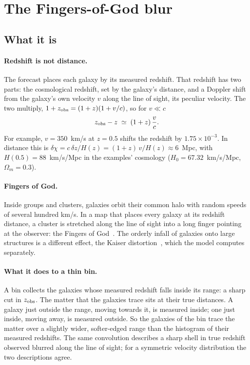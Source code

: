 \documentclass[11pt]{article}
\begin{document}
\section{The Fingers-of-God blur}
\label{sec:fog}

\subsection{What it is}

\paragraph{Redshift is not distance.}
The forecast places each galaxy by its measured redshift.  That
redshift has two parts: the cosmological redshift, set by the
galaxy's distance, and a Doppler shift from the galaxy's own velocity
$v$ along the line of sight, its peculiar velocity.  The two multiply,
$1 + z_{\rm obs} = (1 + z)(1 + v/c)$, so for $v \ll c$
\begin{equation}
  z_{\rm obs} - z \;\simeq\; (1 + z)\,\frac{v}{c} .
  \label{eq:doppler}
\end{equation}
For example, $v = 350$~km/s at $z = 0.5$ shifts the redshift by
$1.75 \times 10^{-3}$.  In distance this is $\delta\chi = c\,\delta
z/H(z) = (1 + z)\,v/H(z) \approx 6$~Mpc, with $H(0.5) = 88$~km/s/Mpc
in the examples' cosmology ($H_0 = 67.32$~km/s/Mpc, $\Omega_m = 0.3$).

\paragraph{Fingers of God.}
Inside groups and clusters, galaxies orbit their common halo with
random speeds of several hundred km/s.  In a map that places every
galaxy at its redshift distance, a cluster is stretched along the line
of sight into a long finger pointing at the observer: the Fingers of
God~\cite{Jackson1972}.  The orderly infall of galaxies onto large
structures is a different effect, the Kaiser
distortion~\cite{Kaiser1987}, which the model computes separately.

\paragraph{What it does to a thin bin.}
A bin collects the galaxies whose measured redshift falls inside its
range: a sharp cut in $z_{\rm obs}$.  The matter that the galaxies
trace sits at their true distances.  A galaxy just outside the range,
moving towards it, is measured inside; one just inside, moving away, is
measured outside.  So the galaxies of the bin trace the matter over a
slightly wider, softer-edged range than the histogram of their measured
redshifts.  The same convolution describes a sharp shell in true
redshift observed blurred along the line of sight; for a symmetric
velocity distribution the two descriptions agree.
\end{document}
